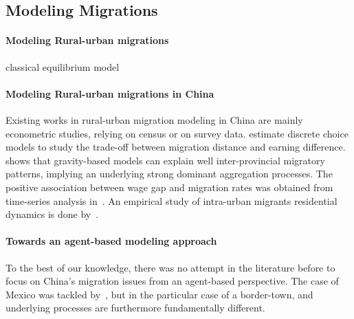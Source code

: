 \subsection{Modeling Migrations}


\paragraph{Modeling Rural-urban migrations}

\cite{todaro1969model} classical equilibrium model


\paragraph{Modeling Rural-urban migrations in China}

Existing works in rural-urban migration modeling in China are mainly econometric studies, relying on census or on survey data. \cite{zhang2013measuring} estimate discrete choice models to study the trade-off between migration distance and earning difference. \cite{fan2005modeling} shows that gravity-based models can explain well inter-provincial migratory patterns, implying an underlying strong dominant aggregation processes. The positive association between wage gap and migration rates was obtained from time-series analysis in~\cite{zhang2003rural}. An empirical study of intra-urban migrants residential dynamics is done by~\cite{wu2006migrant}.





\paragraph{Towards an agent-based modeling approach}

To the best of our knowledge, there was no attempt in the literature before to focus on China's migration issues from an agent-based perspective. The case of Mexico was tackled by~\cite{de2007netlogo}, but in the particular case of a border-town, and underlying processes are furthermore fundamentally different.

